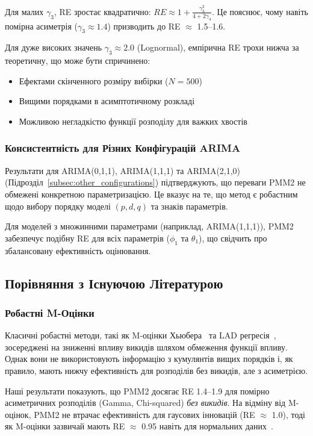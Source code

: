\documentclass[12pt,a4paper]{article}
\begin{document}
Для малих $\gamma_3$, RE зростає квадратично: $RE \approx 1 + \frac{\gamma_3^2}{4 + 2\gamma_4}$. Це пояснює, чому навіть помірна асиметрія ($\gamma_3 \approx 1.4$) призводить до RE $\approx$ 1.5--1.6.

Для дуже високих значень $\gamma_3 \approx 2.0$ (Lognormal), емпірична RE трохи нижча за теоретичну, що може бути спричинено:
\begin{itemize}
    \item Ефектами скінченного розміру вибірки ($N = 500$)
    \item Вищими порядками в асимптотичному розкладі
    \item Можливою негладкістю функції розподілу для важких хвостів
\end{itemize}

\subsubsection{Консистентність для Різних Конфігурацій ARIMA}

Результати для ARIMA(0,1,1), ARIMA(1,1,1) та ARIMA(2,1,0) (Підрозділ~\ref{subsec:other_configurations}) підтверджують, що переваги PMM2 не обмежені конкретною параметризацією. Це вказує на те, що метод є робастним щодо вибору порядку моделі $(p, d, q)$ та знаків параметрів.

Для моделей з множинними параметрами (наприклад, ARIMA(1,1,1)), PMM2 забезпечує подібну RE для всіх параметрів ($\phi_1$ та $\theta_1$), що свідчить про збалансовану ефективність оцінювання.

\subsection{Порівняння з Існуючою Літературою}
\label{subsec:literature_comparison}

\subsubsection{Робастні M-Оцінки}

Класичні робастні методи, такі як M-оцінки Хьюбера~\cite{huber1964robust} та LAD регресія~\cite{koenker1978regression}, зосереджені на зниженні впливу викидів шляхом обмеження функції впливу. Однак вони не використовують інформацію з кумулянтів вищих порядків і, як правило, мають нижчу ефективність для розподілів без викидів, але з асиметрією.

Наші результати показують, що PMM2 досягає RE 1.4--1.9 для помірно асиметричних розподілів (Gamma, Chi-squared) \textit{без викидів}. На відміну від M-оцінок, PMM2 не втрачає ефективність для гаусових інновацій (RE $\approx$ 1.0), тоді як M-оцінки зазвичай мають RE $\approx$ 0.95 навіть для нормальних даних~\cite{hampel1986robust}.
\end{document}
